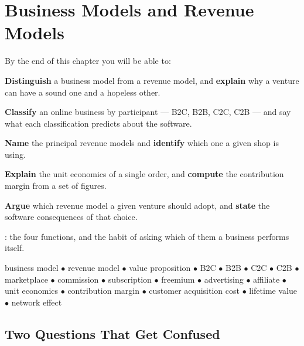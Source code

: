 \chapter{Business Models and Revenue Models}\label{ch:models}

\begin{outcomes}
By the end of this chapter you will be able to:
\begin{tight}
  \item \textbf{Distinguish} a business model from a revenue model, and
        \textbf{explain} why a venture can have a sound one and a hopeless
        other.
  \item \textbf{Classify} an online business by participant --- B2C, B2B, C2C,
        C2B --- and say what each classification predicts about the software.
  \item \textbf{Name} the principal revenue models and \textbf{identify} which
        one a given shop is using.
  \item \textbf{Explain} the unit economics of a single order, and
        \textbf{compute} the contribution margin from a set of figures.
  \item \textbf{Argue} which revenue model a given venture should adopt, and
        \textbf{state} the software consequences of that choice.
\end{tight}
\end{outcomes}

\begin{prereq}
: the four functions, and the habit of asking which of them a
business performs itself.
\end{prereq}

\begin{keyterms}
business model $\bullet$ revenue model $\bullet$ value proposition $\bullet$
B2C $\bullet$ B2B $\bullet$ C2C $\bullet$ C2B $\bullet$ marketplace $\bullet$
commission $\bullet$ subscription $\bullet$ freemium $\bullet$ advertising
$\bullet$ affiliate $\bullet$ unit economics $\bullet$ contribution margin
$\bullet$ customer acquisition cost $\bullet$ lifetime value $\bullet$
network effect
\end{keyterms}

\section{Two Questions That Get Confused}

